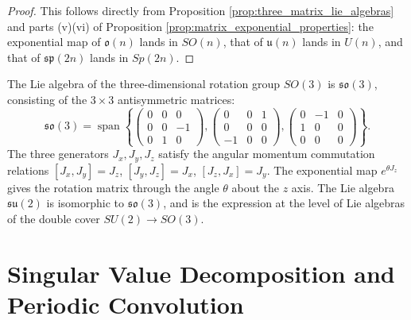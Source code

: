 \begin{proof}
This follows directly from Proposition \ref{prop:three_matrix_lie_algebras} and parts (v)(vi) of Proposition \ref{prop:matrix_exponential_properties}: the exponential map of $\mathfrak{o}(n)$ lands in $SO(n)$, that of $\mathfrak{u}(n)$ lands in $U(n)$, and that of $\mathfrak{sp}(2n)$ lands in $Sp(2n)$.
\end{proof}

\begin{example}\label{ex:su2_rotation}
The Lie algebra of the three-dimensional rotation group $SO(3)$ is $\mathfrak{so}(3)$, consisting of the $3 \times 3$ antisymmetric matrices:
\[
\mathfrak{so}(3) = \operatorname{span}\left\{
\begin{pmatrix} 0 & 0 & 0 \\ 0 & 0 & -1 \\ 0 & 1 & 0 \end{pmatrix},
\begin{pmatrix} 0 & 0 & 1 \\ 0 & 0 & 0 \\ -1 & 0 & 0 \end{pmatrix},
\begin{pmatrix} 0 & -1 & 0 \\ 1 & 0 & 0 \\ 0 & 0 & 0 \end{pmatrix}
\right\}.
\]
The three generators $J_x, J_y, J_z$ satisfy the angular momentum commutation relations $[J_x, J_y] = J_z$, $[J_y, J_z] = J_x$, $[J_z, J_x] = J_y$. The exponential map $e^{\theta J_z}$ gives the rotation matrix through the angle $\theta$ about the $z$ axis. The Lie algebra $\mathfrak{su}(2)$ is isomorphic to $\mathfrak{so}(3)$, and is the expression at the level of Lie algebras of the double cover $SU(2) \to SO(3)$.
\end{example}


\section{\texorpdfstring{Singular Value Decomposition and Periodic Convolution}{Singular Value Decomposition and Periodic Convolution}}

